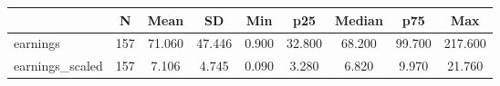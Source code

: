 \begin{tabular}{lcccccccc}
\toprule
 & N & Mean & SD & Min & p25 & Median & p75 & Max \\
\midrule
earnings & 157 & 71.060 & 47.446 & 0.900 & 32.800 & 68.200 & 99.700 & 217.600 \\
earnings\_scaled & 157 & 7.106 & 4.745 & 0.090 & 3.280 & 6.820 & 9.970 & 21.760 \\
\bottomrule
\end{tabular}
